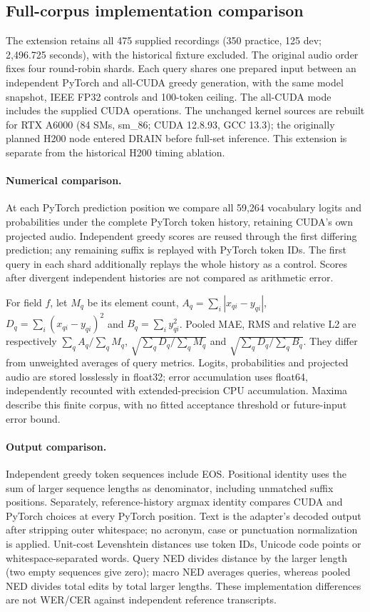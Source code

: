 \subsection{Full-corpus implementation comparison}\label{app:asr-full}
The extension retains all 475 supplied recordings (350 practice, 125 dev; 2,496.725 seconds), with the historical fixture excluded. The original audio order fixes four round-robin shards. Each query shares one prepared input between an independent PyTorch and all-CUDA greedy generation, with the same model snapshot, IEEE FP32 controls and 100-token ceiling. The all-CUDA mode includes the supplied CUDA operations. The unchanged kernel sources are rebuilt for RTX A6000 (84 SMs, sm\_86; CUDA 12.8.93, GCC 13.3); the originally planned H200 node entered DRAIN before full-set inference. This extension is separate from the historical H200 timing ablation.

\paragraph{Numerical comparison.} At each PyTorch prediction position we compare all 59,264 vocabulary logits and probabilities under the complete PyTorch token history, retaining CUDA's own projected audio. Independent greedy scores are reused through the first differing prediction; any remaining suffix is replayed with PyTorch token IDs. The first query in each shard additionally replays the whole history as a control. Scores after divergent independent histories are not compared as arithmetic error.

For field $f$, let $M_q$ be its element count, $A_q=\sum_i|x_{qi}-y_{qi}|$, $D_q=\sum_i(x_{qi}-y_{qi})^2$ and $B_q=\sum_i y_{qi}^2$. Pooled MAE, RMS and relative L2 are respectively $\sum_q A_q/\sum_q M_q$, $\sqrt{\sum_q D_q/\sum_q M_q}$ and $\sqrt{\sum_q D_q/\sum_q B_q}$. They differ from unweighted averages of query metrics. Logits, probabilities and projected audio are stored losslessly in float32; error accumulation uses float64, independently recounted with extended-precision CPU accumulation. Maxima describe this finite corpus, with no fitted acceptance threshold or future-input error bound.

\paragraph{Output comparison.} Independent greedy token sequences include EOS. Positional identity uses the sum of larger sequence lengths as denominator, including unmatched suffix positions. Separately, reference-history argmax identity compares CUDA and PyTorch choices at every PyTorch position. Text is the adapter's decoded output after stripping outer whitespace; no acronym, case or punctuation normalization is applied. Unit-cost Levenshtein distances use token IDs, Unicode code points or whitespace-separated words. Query NED divides distance by the larger length (two empty sequences give zero); macro NED averages queries, whereas pooled NED divides total edits by total larger lengths. These implementation differences are not WER/CER against independent reference transcripts.

